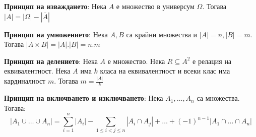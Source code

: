 \documentclass{article}
\renewcommand{\\}{\newline}
\begin{document}
      \textbf{Принцип на изваждането}: Нека \(A\) е множество в универсум \(\Omega\). Тогава \(\left|A\right| = \left|\Omega\right|-\left|\bar{A}\right|\)

      \textbf{Принцип на умножението}: Нека \(A, B\) са крайни множества и \(\left|A\right|=n, \left|B\right|=m\). Тогава \(\left|A \times B\right| = \left|A\right|.\left|B\right|=n.m\)    

      \textbf{Принцип на делението}: Нека \(A\) е множество. Нека \(R \subseteq A^{2}\) е релация на еквивалентност. Нека \(A\) има \(k\) класа на еквивалентност и всеки клас има кардиналност \(m\). Тогава \(m =\frac{\left|A\right|}{k}\) 

      \textbf{Принцип на включването и изключването}: Нека \(A_1, \dots, A_n\) са множества. Тогава:
      \[
        \left|A_1\cup\dots\cup A_n\right|=\sum_{i=1}^{n}\left|A_i\right| - \sum_{1 \leq i < j \leq n}\left|A_i \cap A_j\right| + \dots + (-1)^{n-1}\left|A_1 \cap \dots \cap A_n\right|
      \] 
\end{document}
